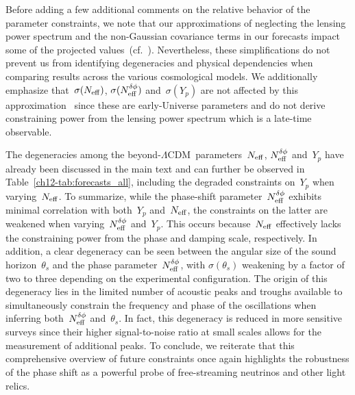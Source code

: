 \begin{subappendices}
Before adding a few additional comments on the relative behavior of the parameter constraints, we note that our approximations of neglecting the lensing power spectrum and the non-Gaussian covariance terms in our forecasts impact some of the projected values~(cf.~\cite{Green:2016cjr}). Nevertheless, these simplifications do not prevent us from identifying degeneracies and physical dependencies when comparing results across the various cosmological models. We additionally emphasize that~$\sigma(N_\mathrm{eff})$, $\sigma(N_\mathrm{eff}^{\delta\phi})$ and~$\sigma(Y_p)$ are not affected by this approximation~\cite{Green:2016cjr} since these are early-Universe parameters and do not derive constraining power from the lensing power spectrum which is a late-time observable.

The degeneracies among the beyond-$\Lambda$CDM~parameters~$N_\mathrm{eff}$, $N_\mathrm{eff}^{\delta\phi}$ and~$Y_p$ have already been discussed in the main text and can further be observed in Table~\ref{ch12-tab:forecasts_all}, including the degraded constraints on~$Y_p$ when varying~$N_\mathrm{eff}$. To summarize, while the phase-shift parameter~$N_\mathrm{eff}^{\delta\phi}$ exhibits minimal correlation with both~$Y_p$ and~$N_\mathrm{eff}$, the constraints on the latter are weakened when varying~$N_\mathrm{eff}^{\delta\phi}$ and~$Y_p$. This occurs because~$N_\mathrm{eff}$ effectively lacks the constraining power from the phase and damping scale, respectively. In addition, a clear degeneracy can be seen between the angular size of the sound horizon~$\theta_s$ and the phase parameter~$N_\mathrm{eff}^{\delta\phi}$, with $\sigma(\theta_s)$ weakening by a factor of two to three depending on the experimental configuration. The origin of this degeneracy lies in the limited number of acoustic peaks and troughs available to simultaneously constrain the frequency and phase of the oscillations when inferring both~$N_\mathrm{eff}^{\delta\phi}$ and~$\theta_s$. In fact, this degeneracy is reduced in more sensitive surveys since their higher signal-to-noise ratio at small scales allows for the measurement of additional peaks. To conclude, we reiterate that this comprehensive overview of future constraints once again highlights the robustness of the phase shift as a powerful probe of free-streaming neutrinos and other light relics.






\end{subappendices}
